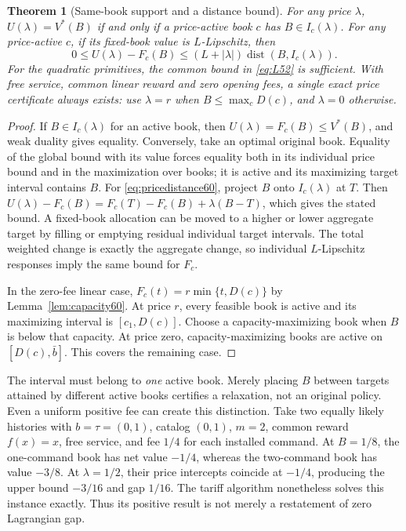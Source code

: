 \documentclass[11pt,letterpaper]{article}
\newtheorem{theorem}{Theorem}[section]
\theoremstyle{definition}\newtheorem{remark}[theorem]{Remark}
\begin{document}
\begin{theorem}[Same-book support and a distance bound]\label{thm:pricebridge60}
For any price $\lambda$, $U(\lambda)=V^*(B)$ if and only if a price-active book $c$ has $B\in I_c(\lambda)$. For any price-active $c$, if its fixed-book value is $L$-Lipschitz, then
\begin{equation}\label{eq:pricedistance60}
 0\leq U(\lambda)-F_c(B)
 \leq (L+|\lambda|)\operatorname{dist}(B,I_c(\lambda)).
\end{equation}
For the quadratic primitives, the common bound in \eqref{eq:L52} is sufficient. With free service, common linear reward and zero opening fees, a single exact price certificate always exists: use $\lambda=r$ when $B\leq\max_c D(c)$, and $\lambda=0$ otherwise.
\end{theorem}
\begin{proof}
If $B\in I_c(\lambda)$ for an active book, then $U(\lambda)=F_c(B)\leq V^*(B)$, and weak duality gives equality. Conversely, take an optimal original book. Equality of the global bound with its value forces equality both in its individual price bound and in the maximization over books; it is active and its maximizing target interval contains $B$. For \eqref{eq:pricedistance60}, project $B$ onto $I_c(\lambda)$ at $T$. Then
$U(\lambda)-F_c(B)=F_c(T)-F_c(B)+\lambda(B-T)$, which gives the stated bound. A fixed-book allocation can be moved to a higher or lower aggregate target by filling or emptying residual individual target intervals. The total weighted change is exactly the aggregate change, so individual $L$-Lipschitz responses imply the same bound for $F_c$.

In the zero-fee linear case, $F_c(t)=r\min\{t,D(c)\}$ by Lemma~\ref{lem:capacity60}. At price $r$, every feasible book is active and its maximizing interval is $[c_1,D(c)]$. Choose a capacity-maximizing book when $B$ is below that capacity. At price zero, capacity-maximizing books are active on $[D(c),\bar b]$. This covers the remaining case.
\end{proof}

The interval must belong to \emph{one} active book. Merely placing $B$ between targets attained by different active books certifies a relaxation, not an original policy. Even a uniform positive fee can create this distinction. Take two equally likely histories with $b=\tau=(0,1)$, catalog $(0,1)$, $m=2$, common reward $f(x)=x$, free service, and fee $1/4$ for each installed command. At $B=1/8$, the one-command book has net value $-1/4$, whereas the two-command book has value $-3/8$. At $\lambda=1/2$, their price intercepts coincide at $-1/4$, producing the upper bound $-3/16$ and gap $1/16$. The tariff algorithm nonetheless solves this instance exactly. Thus its positive result is not merely a restatement of zero Lagrangian gap.
\end{document}
